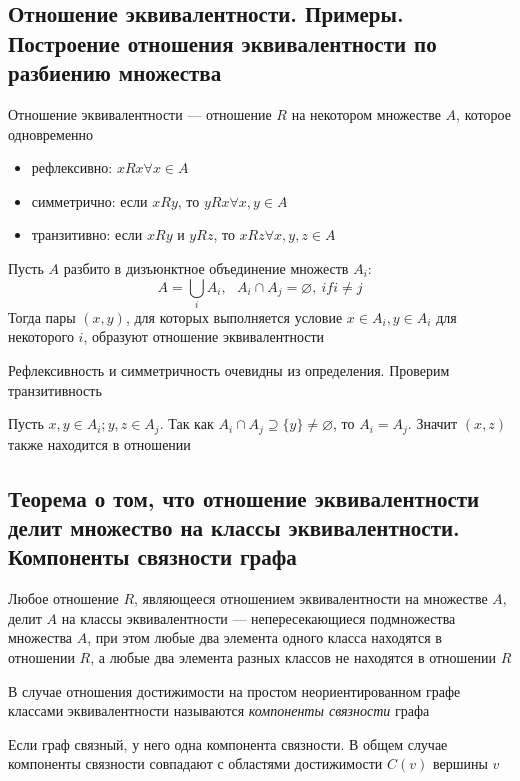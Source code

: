 \documentclass[a4paper]{article}
\begin{document}
\subsection{Отношение эквивалентности. Примеры. Построение отношения эквивалентности по разбиению множества}
\label{sec:1.68} Отношение эквивалентности — отношение $R$ на некотором множестве $A$, которое одновременно 
\begin{itemize}
    \item рефлексивно: $xRx\forall x\in A$
    \item симметрично: если $xRy$, то $yRx\forall x,y\in A$
    \item транзитивно: если $xRy$ и $yRz$, то $xRz\forall x,y,z\in A$
\end{itemize}
\ex Пусть $A$ разбито в дизъюнктное объединение множеств $A_i$:
$$A=\bigcup_i A_i,\ \ \ A_i\cap A_j=\varnothing,\ if i\ne j$$
Тогда пары $(x,y)$, для которых выполняется условие $x\in A_i, y\in A_i$ для некоторого $i$, образуют отношение эквивалентности

Рефлексивность и симметричность очевидны из определения. Проверим транзитивность

Пусть $x,y\in A_i; y,z\in A_j$. Так как $A_i \cap A_j\supseteq \{y\}\ne\varnothing$, то $A_i = A_j$. Значит $(x, z)$ также находится в отношении

\subsection{Теорема о том, что отношение эквивалентности делит множество на классы эквивалентности. Компоненты связности графа}
\label{sec:1.69}\theorem Любое отношение $R$, являющееся отношением эквивалентности на множестве $A$, делит $A$ на классы эквивалентности — непересекающиеся подмножества множества $A$, при этом любые два элемента одного класса находятся в отношении $R$, а любые два элемента разных классов не находятся в отношении $R$

 В случае отношения достижимости на простом неориентированном графе классами эквивалентности называются \textit{компоненты связности} графа

Если граф связный, у него одна компонента связности. В общем случае компоненты связности совпадают с областями достижимости $C(v)$ вершины $v$
\end{document}
